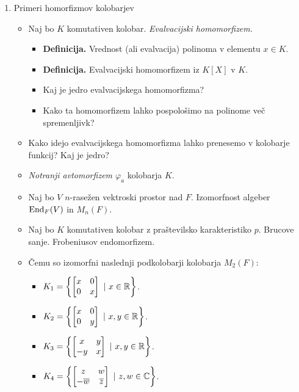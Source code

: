 \begin{enumerate}
    \newpage
    \item Primeri homorfizmov kolobarjev
    \begin{itemize}
        \item Naj bo $K$ komutativen kolobar. \emph{Evalvacijski homomorfizem.}
        \begin{itemize}
            \item \colorbox{purple!30}{\textbf{Definicija.}} Vrednost (ali evalvacija) polinoma v elementu $x \in K$.
            \item \colorbox{purple!30}{\textbf{Definicija.}} Evalvacijski homomorfizem iz $K[X]$ v $K$.
            \item Kaj je jedro evalvacijskega homomorfizma?
            \item Kako ta homomorfizem lahko pospološimo na polinome več spremenljivk?
        \end{itemize}
        \item Kako idejo evalvacijskega homomorfizma lahko prenesemo v kolobarje funkcij? Kaj je jedro?
        \item \emph{Notranji avtomorfizem $\varphi_a$} kolobarja $K$.
        \item Naj bo $V$ $n$-rasežen vektroski prostor nad $F$. Izomorfnost algeber $\operatorname{End}_F(V)$ in $M_n(F)$.
        \item Naj bo $K$ komutativen kolobar z praštevilsko karakteristiko $p$. Brucove sanje. Frobeniusov endomorfizem.
        \item Čemu so izomorfni naslednji podkolobarji kolobarja $M_2(F)$:
        \begin{itemize}
            \item $K_1 = \left\{\begin{bmatrix}
            x & 0 \\ 0 & x
            \end{bmatrix} \ | \ x \in \mathbb{R}\right\}$.
            \item $K_2 = \left\{\begin{bmatrix}
            x & 0 \\ 0 & y
            \end{bmatrix} \ | \ x,y \in \mathbb{R}\right\}$.
            \item $K_3 = \left\{\begin{bmatrix}
            x & y \\ -y & x
            \end{bmatrix} \ | \ x, y \in \mathbb{R}\right\}$.
            \item $K_4 = \left\{\begin{bmatrix}
            z & w \\ -\overline{w} & \overline{z}
            \end{bmatrix} \ | \ z, w \in \mathbb{C}\right\}$.
        \end{itemize}
    \end{itemize}
\end{enumerate}